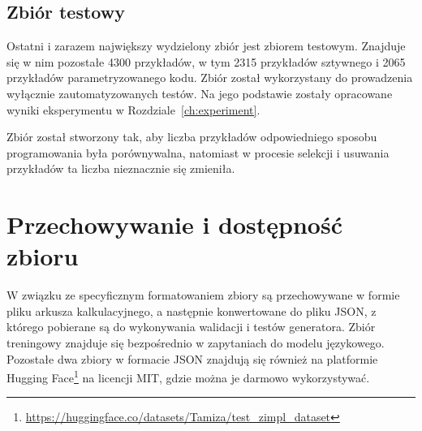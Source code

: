 \subsection{Zbiór testowy}

Ostatni i zarazem największy wydzielony zbiór jest zbiorem testowym. Znajduje się w nim pozostałe 4300 przykładów, w tym 2315 przykładów sztywnego i 2065 przykładów parametryzowanego kodu. Zbiór został wykorzystany do prowadzenia wyłącznie zautomatyzowanych testów. Na jego podstawie zostały opracowane wyniki eksperymentu w Rozdziale~\ref{ch:experiment}.

Zbiór został stworzony tak, aby liczba przykładów odpowiedniego sposobu programowania była porównywalna, natomiast w procesie selekcji i usuwania przykładów ta liczba nieznacznie się zmieniła.

\section{Przechowywanie i dostępność zbioru}

W związku ze specyficznym formatowaniem zbiory są przechowywane w formie pliku arkusza kalkulacyjnego, a następnie konwertowane do pliku JSON, z którego pobierane są do wykonywania walidacji i testów generatora. Zbiór treningowy znajduje się bezpośrednio w zapytaniach do modelu językowego. Pozostałe dwa zbiory w formacie JSON znajdują się również na platformie Hugging Face\footnote{\label{fn:dataset:link}\url{https://huggingface.co/datasets/Tamiza/test_zimpl_dataset}} na licencji MIT, gdzie można je darmowo wykorzystywać. %